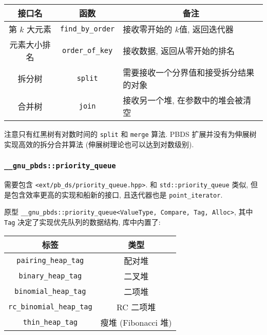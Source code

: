\begin{center}
  \begin{tabular}{ccl}
    \toprule
    \textbf{接口名} & \textbf{函数} & \multicolumn{1}{c}{\textbf{备注}} \\
    \toprule
    第 $k$ 大元素 & \lstinline|find_by_order| & 接收零开始的 $k$值, 返回迭代器 \\
    \midrule
    元素大小排名 & \lstinline|order_of_key| & 接收数据, 返回从零开始的排名 \\
    \midrule
    拆分树 & \lstinline|split| & 需要接收一个分界值和接受拆分结果的对象 \\
    \midrule
    合并树 & \lstinline|join| & 接收另一个堆, 在参数中的堆会被清空 \\
    \bottomrule
  \end{tabular}
\end{center}

注意只有红黑树有对数时间的 \lstinline{split} 和 \lstinline{merge} 算法. PBDS 扩展并没有为伸展树实现高效的拆分合并算法 (伸展树理论也可以达到对数级别).

\clearpage
\subsubsection{\lstinline[basicstyle=\mono]{__gnu_pbds::priority_queue}}
需要包含 \lstinline{<ext/pb_ds/priority_queue.hpp>}. 和 \lstinline{std::priority_queue} 类似, 但是包含效率更高的实现和船新的接口, 且迭代器也是 \lstinline{point_iterator}.

原型 \lstinline{__gnu_pbds::priority_queue<ValueType, Compare, Tag, Alloc>}, 其中 \lstinline{Tag} 决定了实现优先队列的数据结构, 库中内置了:

\begin{center}
  \begin{tabular}{cc}
    \toprule
    \textbf{标签} & \textbf{类型} \\
    \toprule
    \lstinline|pairing_heap_tag| & 配对堆 \\
    \midrule
    \lstinline|binary_heap_tag| & 二叉堆 \\
    \midrule
    \lstinline|binomial_heap_tag| & 二项堆 \\
    \midrule
    \lstinline|rc_binomial_heap_tag| & RC 二项堆 \\
    \midrule
    \lstinline|thin_heap_tag| & 瘦堆 (Fibonacci 堆) \\
    \bottomrule
  \end{tabular}
\end{center}

